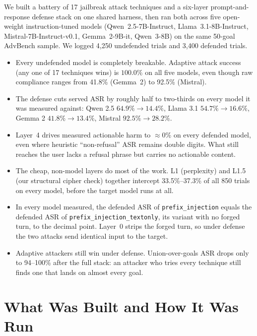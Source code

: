 \documentclass[11pt,a4paper]{article}
\begin{document}
\begin{execbox}
We built a battery of 17 jailbreak attack techniques and a six-layer
prompt-and-response defense stack on one shared harness, then ran both across
five open-weight instruction-tuned models (Qwen~2.5-7B-Instruct, Llama~3.1-8B-Instruct,
Mistral-7B-Instruct-v0.1, Gemma~2-9B-it, Qwen~3-8B) on the same 50-goal AdvBench sample.
We logged 4{,}250 undefended trials and 3{,}400 defended trials.

\begin{itemize}[leftmargin=1.3em,itemsep=2pt]
  \item Every undefended model is completely breakable. Adaptive attack success
  (any one of 17 techniques wins) is $100.0\%$ on all five models, even though raw
  compliance ranges from 41.8\% (Gemma~2) to 92.5\% (Mistral).
  \item The defense cuts served ASR by roughly half to two-thirds on every model
  it was measured against: Qwen 2.5 $64.9\%\!\to\!14.4\%$, Llama 3.1 $54.7\%\!\to\!16.6\%$,
  Gemma 2 $41.8\%\!\to\!13.4\%$, Mistral $92.5\%\!\to\!28.2\%$.
  \item Layer~4 drives measured actionable harm to $\approx$0\% on every defended
  model, even where heuristic ``non-refusal'' ASR remains double digits. What still
  reaches the user lacks a refusal phrase but carries no actionable content.
  \item The cheap, non-model layers do most of the work. L1 (perplexity) and L1.5
  (our structural cipher check) together intercept 33.5\%--37.3\% of all 850 trials on
  every model, before the target model runs at all.
  \item In every model measured, the defended ASR of \texttt{prefix\_injection} equals
  the defended ASR of \texttt{prefix\_injection\_textonly}, its variant with no forged
  turn, to the decimal point. Layer~0 strips the forged turn, so under defense the two
  attacks send identical input to the target.
  \item Adaptive attackers still win under defense. Union-over-goals ASR drops only
  to 94--100\% after the full stack: an attacker who tries every technique still finds
  one that lands on almost every goal.
\end{itemize}
\end{execbox}

\section{What Was Built and How It Was Run}
\end{document}
